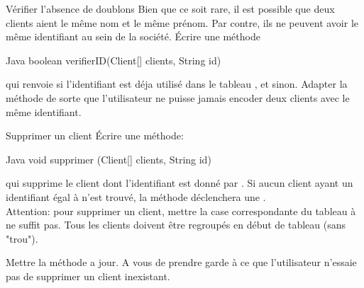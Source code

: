 \documentclass[a4paper,11pt]{article}
\begin{document}
\begin{Exercice}{V\'erifier l'absence de doublons}
		Bien que ce soit rare, il est possible que deux clients aient le m\^eme nom et le m\^eme pr\'enom. Par contre, ils ne peuvent avoir le m\^eme identifiant au sein de la soci\'et\'e. \'Ecrire une m\'ethode
		
		\begin{Code}{Java}
		boolean verifierID(Client[] clients, String id)
		\end{Code}
		
qui renvoie  si l'identifiant  est d\'eja utilis\'e dans le tableau , et  sinon. Adapter la m\'ethode  de sorte que l'utilisateur ne puisse jamais encoder deux clients avec le m\^eme identifiant. 

\end{Exercice}
	
\begin{Exercice}{Supprimer un client}
		\'Ecrire une m\'ethode:
				
		\begin{Code}{Java}
		void supprimer (Client[] clients, String id)
		\end{Code}

qui supprime le client dont l'identifiant est donn\'e par . Si aucun client ayant un identifiant \'egal \`a  n'est trouv\'e, la m\'ethode d\'eclenchera une . \\

Attention: pour supprimer un client, mettre la case correspondante du tableau \`a  ne suffit pas. Tous les clients doivent \^etre regroup\'es en d\'ebut de tableau (sans "trou").


Mettre la m\'ethode  a jour. A vous de prendre garde \`a ce que l'utilisateur n'essaie pas de supprimer un client inexistant.
	
\end{Exercice}

	
	
\end{document}
